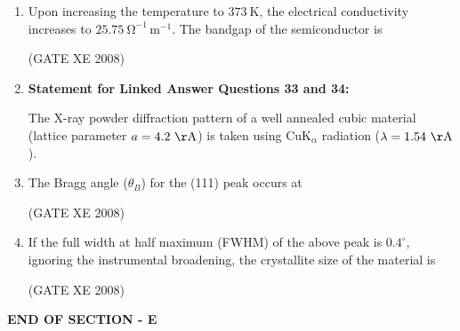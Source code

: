 \documentclass[12pt]{article}
\begin{document}
\begin{enumerate}
    (GATE XE 2008)

    \item Upon increasing the temperature to $373 \ \mathrm{K}$, the electrical conductivity increases to $25.75 \ \mathrm{\Omega^{-1} \, m^{-1}}$. The bandgap of the semiconductor is

\begin{enumerate}
\end{enumerate}
    
    (GATE XE 2008)

    \item[] \textbf{Statement for Linked Answer Questions 33 and 34:} 

    The X-ray powder diffraction pattern of a well annealed cubic material (lattice parameter $a = 4.2 \ \mathrm{\AA}$) is taken using CuK$_\alpha$ radiation ($\lambda = 1.54 \ \mathrm{\AA}$).

    \item The Bragg angle ($\theta_B$) for the (111) peak occurs at

\begin{enumerate}
\end{enumerate}
   
    (GATE XE 2008)

    \item If the full width at half maximum (FWHM) of the above peak is $0.4^{\circ}$, ignoring the instrumental broadening, the crystallite size of the material is

\begin{enumerate}
\end{enumerate}
    
    (GATE XE 2008)

\end{enumerate}    
\begin{center}
    \textbf{END OF SECTION - E}
\end{center}
\end{document}
